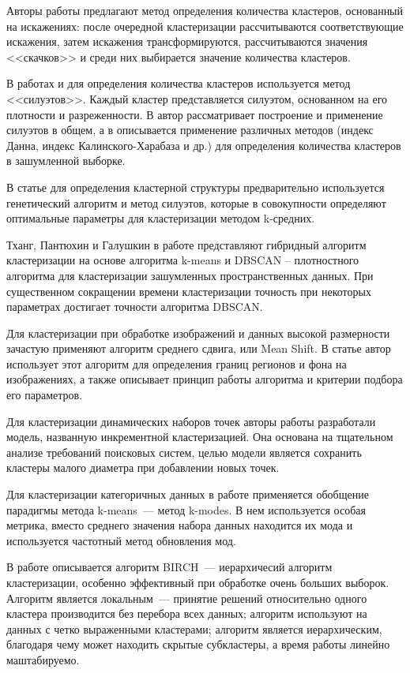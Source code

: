 Авторы работы \cite{numbers} предлагают метод определения количества кластеров, основанный на искажениях: после очередной кластеризации рассчитываются соответствующие искажения, затем искажения трансформируются, рассчитываются значения <<скачков>> и среди них выбирается значение количества кластеров.

В работах \cite{silhouettes} и \cite{rescale} для определения количества кластеров используется метод <<силуэтов>>. Каждый кластер представляется силуэтом, основанном на его плотности и разреженности. В \cite{silhouettes} автор рассматривает построение и применение силуэтов в общем, а в \cite{rescale} описывается применение различных методов (индекс Данна, индекс Калинского-Харабаза и др.) для определения количества кластеров в зашумленной выборке.

В статье \cite{genetic} для определения кластерной структуры предварительно используется генетический алгоритм и метод силуэтов, которые в совокупности определяют оптимальные параметры для кластеризации методом k-средних.

Тханг, Пантюхин и Галушкин в работе \cite{FDBSCAN} представляют гибридный алгоритм кластеризации на основе алгоритма k-means и DBSCAN – плотностного алгоритма для кластеризации зашумленных пространственных данных. При существенном сокращении времени кластеризации точность при некоторых параметрах достигает точности алгоритма DBSCAN.

Для кластеризации при обработке изображений и данных высокой размерности зачастую применяют алгоритм среднего сдвига, или Mean Shift. В статье \cite{ms} автор использует этот алгоритм для определения границ регионов и фона на изображениях, а также описывает принцип работы алгоритма и критерии подбора его параметров.

Для кластеризации динамических наборов точек авторы работы \cite{inc} разработали модель, названную инкрементной кластеризацией. Она основана на тщательном анализе требований поисковых систем, целью модели является сохранить кластеры малого диаметра при добавлении новых точек.

Для кластеризации категоричных данных в работе \cite{huang} применяется обобщение парадигмы метода k-means~--- метод k-modes. В нем используется особая метрика, вместо среднего значения набора данных находится их мода и используется частотный метод обновления мод.

В работе \cite{birch} описывается алгоритм BIRCH~--- иерархичесий алгоритм кластеризации, особенно эффективный при обработке очень больших выборок. Алгоритм является локальным~--- принятие решений относительно одного кластера производится без перебора всех данных; алгоритм используют на данных с четко выраженными кластерами; алгоритм является иерархическим, благодаря чему может находить скрытые субкластеры, а время работы линейно маштабируемо.

